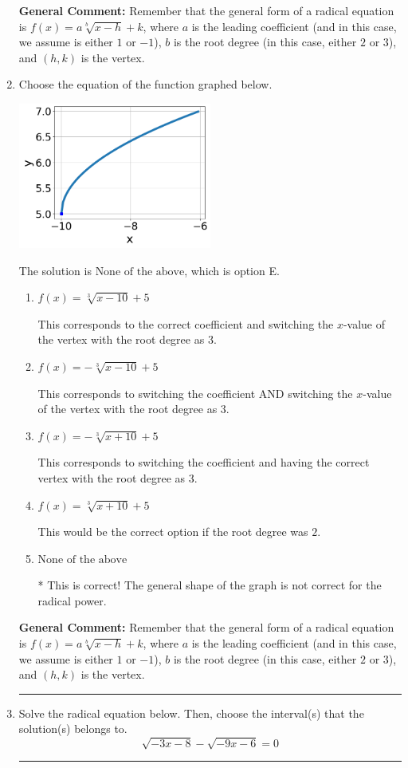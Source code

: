 \documentclass{extbook}[14pt]
\newcommand{\litem}[1]{\item #1

\rule{\textwidth}{0.4pt}}
\begin{document}
\begin{enumerate}
{\textbf{General Comment:} Remember that the general form of a radical equation is $ f(x) = a \sqrt[b]{x - h} + k$, where $a$ is the leading coefficient (and in this case, we assume is either $1$ or $-1$), $b$ is the root degree (in this case, either $2$ or $3$), and $(h, k)$ is the vertex.
}
\litem{
Choose the equation of the function graphed below.

\begin{center}
    \includegraphics[width=0.5\textwidth]{../Figures/radicalGraphToEquationB.png}
\end{center}




The solution is \( \text{None of the above} \), which is option E.\begin{enumerate}[label=\Alph*.]
\item \( f(x) = \sqrt[3]{x - 10} + 5 \)

This corresponds to the correct coefficient and switching the $x$-value of the vertex with the root degree as $3$.
\item \( f(x) = - \sqrt[3]{x - 10} + 5 \)

This corresponds to switching the coefficient AND switching the $x$-value of the vertex with the root degree as $3$.
\item \( f(x) = - \sqrt[3]{x + 10} + 5 \)

This corresponds to switching the coefficient and having the correct vertex with the root degree as $3$.
\item \( f(x) = \sqrt[3]{x + 10} + 5 \)

This would be the correct option if the root degree was $2$.
\item \( \text{None of the above} \)

* This is correct! The general shape of the graph is not correct for the radical power.
\end{enumerate}

\textbf{General Comment:} Remember that the general form of a radical equation is $ f(x) = a \sqrt[b]{x - h} + k$, where $a$ is the leading coefficient (and in this case, we assume is either $1$ or $-1$), $b$ is the root degree (in this case, either $2$ or $3$), and $(h, k)$ is the vertex.
}
\litem{
Solve the radical equation below. Then, choose the interval(s) that the solution(s) belongs to.
\[ \sqrt{-3 x - 8} - \sqrt{-9 x - 6} = 0 \]

}
\end{enumerate}
\end{document}

